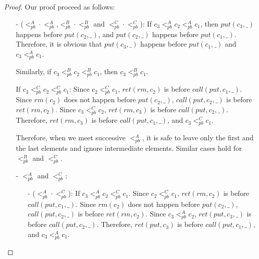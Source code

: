 \begin {proof}

Our proof proceed as follows:

\begin{itemize}
\setlength{\itemsep}{0.5pt}
\item[-] ($<_{\textit{pb}}^A \cdot <_{\textit{pb}}^A$,$<_{\textit{pb}}^B \cdot <_{\textit{pb}}^B$ and $<_{\textit{pb}}^C \cdot <_{\textit{pb}}^C$): If $c_3 <_{\textit{pb}}^A c_2 <_{\textit{pb}}^A c_1$, then $\textit{put}(c_3,\_)$ happens before $\textit{put}(c_2,\_)$, and $\textit{put}(c_2,\_)$ happens before $\textit{put}(c_1,\_)$. Therefore, it is obvious that $\textit{put}(c_3,\_)$ happens before $\textit{put}(c_1,\_)$ and $c_3 <_{\textit{pb}}^A c_1$.

    Similarly, if $c_3 <_{\textit{pb}}^B c_2 <_{\textit{pb}}^B c_1$, then $c_3 <_{\textit{pb}}^B c_1$.

    If $c_3 <_{\textit{pb}}^C c_2 <_{\textit{pb}}^C c_1$: Since $c_2 <_{\textit{pb}}^C c_1$, $\textit{ret}(\textit{rm},c_2)$ is before $\textit{call}(\textit{put},c_1,\_)$. Since $\textit{rm}(c_2)$ does not happen before $\textit{put}(c_2,\_)$, $\textit{call}(\textit{put},c_2,\_)$ is before $\textit{ret}(\textit{rm},c_2)$. Since $c_3 <_{\textit{pb}}^C c_2$, $\textit{ret}(\textit{rm},c_3)$ is before $\textit{call}(\textit{put},c_2,\_)$. Therefore, $\textit{ret}(\textit{rm},c_3)$ is before $\textit{call}(\textit{put},c_1,\_)$, and $c_3 <_{\textit{pb}}^C c_1$.

    Therefore, when we meet successive $<_{\textit{pb}}^A$, it is safe to leave only the first and the last elements and ignore intermediate elements. Similar cases hold for $<_{\textit{pb}}^B$ and $<_{\textit{pb}}^C$.

\item[-] $<_{\textit{pb}}^A$ and $<_{\textit{pb}}^C$:

    \begin{itemize}
    \setlength{\itemsep}{0.5pt}
    \item[-] ($<_{\textit{pb}}^A \cdot <_{\textit{pb}}^C$): If $c_3 <_{\textit{pb}}^A c_2 <_{\textit{pb}}^C c_1$. Since $c_2 <_{\textit{pb}}^C c_1$, $\textit{ret}(\textit{rm},c_2)$ is before $\textit{call}(\textit{put},c_1,\_)$. Since $\textit{rm}(c_2)$ does not happen before $\textit{put}(c_2,\_)$, $\textit{call}(\textit{put},c_2,\_)$ is before $\textit{ret}(\textit{rm},c_2)$. Since $c_3 <_{\textit{pb}}^A c_2$, $\textit{ret}(\textit{put},c_3,\_)$ is before $\textit{call}(\textit{put},c_2,\_)$. Therefore, $\textit{ret}(\textit{put},c_3)$ is before $\textit{call}(\textit{put},c_1,\_)$, and $c_3 <_{\textit{pb}}^A c_1$.


\end{itemize}
\end{itemize}
\end{proof}
